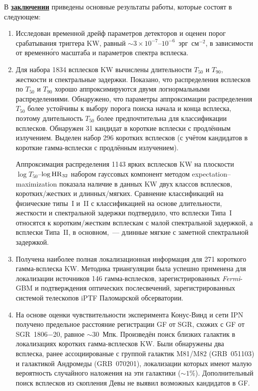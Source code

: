 В \underline{\textbf{заключении}} приведены основные результаты работы, 
которые состоят в следующем:
\begin{enumerate}
 
\item Исследован временной дрейф параметров детекторов и оценен порог 
    срабатывания триггера KW, равный $\sim 3\times10^{-7}$--$10^{-6}$~эрг~см$^{-2}$,
    в зависимости от временн\'{о}го масштаба и параметров спектра всплеска. 
    
\item Для набора 1834 всплесков KW вычислены длительности $T_{50}$ и $T_{90}$, жесткости 
    и спектральные задержки. Показано, что распределения 
    всплесков по $T_{50}$ и $T_{90}$ хорошо аппроксимируются двумя логнормальными 
    распределениями. Обнаружено, что параметры аппроксимации распределения $T_{50}$ 
    более устойчивы к выбору порога поиска начала и конца всплеска, поэтому длительность 
    $T_{50}$ более предпочтительна для классификации всплесков. 
    Обнаружен 31 кандидат в короткие всплески с продлённым излучением.
    Выделен набор 296 коротких всплесков (с учётом кандидатов 
    в короткие гамма-всплески с продлённым излучением). 
      
    Аппроксимация распределения 1143 ярких всплесков KW на плоскости $\log T_{50}$--$\log {\mathrm{HR}}_{32}$ 
    набором гауссовых компонент методом expectation–maximization показала наличие 
    в данных KW двух классов всплесков, коротких/жестких и длинных/мягких. 
    Сравнение классификаций на физические типы~I и~II с классификацией на основе 
    длительности, жесткости и спектральной задержки подтвердило, что всплески Типа~I 
    относятся к коротким/жестким всплескам с малой спектральной задержкой, а всплески 
    Типа~II, в основном,~--- длинные мягкие с заметной спектральной задержкой. 
    
\item Получена наиболее полная локализационная информация для 271 короткого 
    гамма-всплеска KW. 
    Методика триангуляции была успешно применена для 
    локализации источников 146 гамма-всплесков, зарегистрированных \textit{Fermi}-GBM и
    подтверждения оптических послесвечений, зарегистрированных системой телескопов 
    iPTF Паломарской обсерватории.
    
\item На основе оценки чувствительности эксперимента Конус-Винд и сети IPN получено 
    предельное расстояние регистрации GF от SGR, схожих с GF от SGR~1806$-$20, 
    равное $\sim 30$~Мпк. 
    Произведён поиск близких галактик в локализациях коротких гамма-всплесков KW. 
    Были обнаружены два всплеска, ранее 
    ассоциированые с группой галактик M81/M82 (GRB~051103) и галактикой Андромеды (GRB~070201),
    локализации которых имеют малую вероятность случайного наложения на эти галактики ($\sim 1$\%).
    Дополнительный поиск всплесков из скопления Девы не выявил возможных кандидатов в GF.
    

\end{enumerate}

